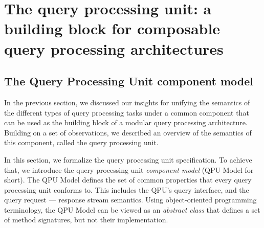 




\section{The query processing unit: a building block for composable query processing architectures}

\subsection{The Query Processing Unit component model}
\label{sec:QPU_model}
In the previous section, we discussed our insights for unifying the semantics of the different types
of query processing tasks under a common component
that can be used as the building block of a modular query processing architecture.
Building on a set of observations,
we described an overview of the semantics of this component, called the query processing unit.

In this section, we formalize the query processing unit specification.
To achieve that, we introduce the query processing unit \textit{component model} (QPU Model for short).
The QPU Model defines the set of common properties that every query processing unit conforms to.
This includes the QPU's query interface, and the query request --- response stream semantics.
Using object-oriented programming terminology, the QPU Model can be viewed as an \textit{abstract class}
that defines a set of method signatures, but not their implementation.

